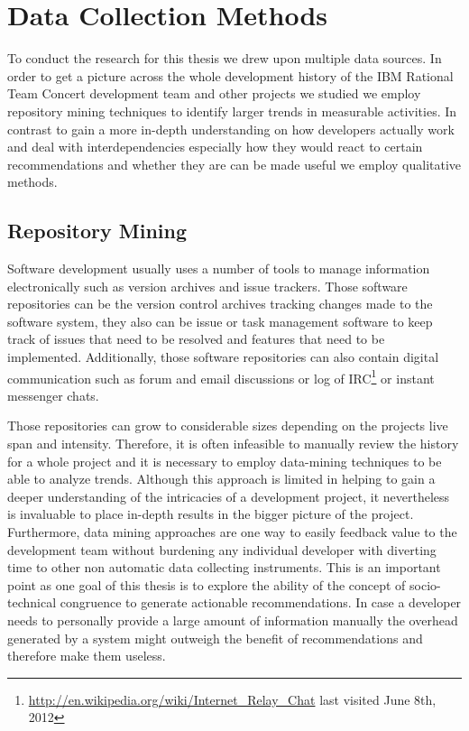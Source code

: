 \section{Data Collection Methods}
\label{c5:sec:datacollection}
To conduct the research for this thesis we drew upon multiple data sources.
In order to get a picture across the whole development history of the IBM Rational Team Concert development team and other projects we studied we employ repository mining techniques to identify larger trends in measurable activities.
In contrast to gain a more in-depth understanding on how developers actually work and deal with interdependencies especially how they would react to certain recommendations and whether they are can be made useful we employ qualitative methods.

\subsection{Repository Mining}
Software development usually uses a number of tools to manage information electronically such as version archives and issue trackers.
Those software repositories can be the version control archives tracking changes made to the software system, they also can be issue or task management software to keep track of issues that need to be resolved and features that need to be implemented.
Additionally, those software repositories can also contain digital communication such as forum and email discussions or log of IRC\footnote{\url{http://en.wikipedia.org/wiki/Internet_Relay_Chat} last visited June 8th, 2012} or instant messenger chats.

Those repositories can grow to considerable sizes depending on the projects live span and intensity. 
Therefore, it is often infeasible to manually review the history for a whole project and it is necessary to employ data-mining techniques to be able to analyze trends.
Although this approach is limited in helping to gain a deeper understanding of the intricacies of a development project, it nevertheless is invaluable to place in-depth results in the bigger picture of the project.
Furthermore, data mining approaches are one way to easily feedback value to the development team without burdening any individual developer with diverting time to other non automatic data collecting instruments.
This is an important point as one goal of this thesis is to explore the ability of the concept of socio-technical congruence to generate actionable recommendations.
In case a developer needs to personally provide a large amount of information manually the overhead generated by a system might outweigh the benefit of recommendations and therefore make them useless.


